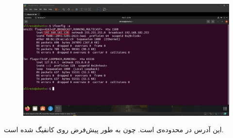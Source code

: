 \documentclass{article}
\begin{document}
\subsection{}
\begin{figure}[H]
    \centering
    \includegraphics[width=1.0\textwidth]{figures/5b.jpg}
    \caption
	{
	}
    \label{fig:fig1}
\end{figure}
این آدرس در محدوده‌ی  است. چون به طور پیش‌فرض  روی  کانفیگ شده است.
\end{document}
